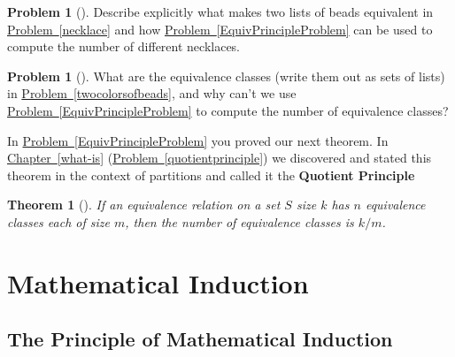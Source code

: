 \documentclass[10pt,]{book}
\newcommand{\terminology}[1]{\textbf{#1}}
\theoremstyle{plain}
\newtheorem{theorem}{Theorem}[section]
\theoremstyle{definition}
\newtheorem{activity}[project]{Problem}
\theoremstyle{definition}
\numberwithin{equation}{chapter}
\begin{document}
\begin{activity}[]\marginsymbol[-1em]{} \label{activity-358}
Describe explicitly what makes two lists of beads equivalent in \hyperref[necklace]{Problem~\ref{necklace}} and how \hyperref[EquivPrincipleProblem]{Problem~\ref{EquivPrincipleProblem}} can be used to compute the number of different necklaces.%
\end{activity}
\begin{activity}[]\marginsymbol[-1em]{} \label{activity-359}
What are the equivalence classes (write them out as sets of lists) in \hyperref[twocolorsofbeads]{Problem~\ref{twocolorsofbeads}}, and why can't we use \hyperref[EquivPrincipleProblem]{Problem~\ref{EquivPrincipleProblem}} to compute the number of equivalence classes?%
\end{activity}
In \hyperref[EquivPrincipleProblem]{Problem~\ref{EquivPrincipleProblem}} you proved our next theorem. In \hyperref[what-is]{Chapter~\ref{what-is}} (\hyperref[quotientprinciple]{Problem~\ref{quotientprinciple}}) we discovered and stated this theorem in the context of partitions and called it the \terminology{Quotient Principle}%
\begin{theorem}[{}]\label{theorem-12}
If an equivalence relation on a set \(S\) size \(k\) has \(n\) equivalence classes each of size \(m\), then the number of equivalence classes is \(k/m\).%
\end{theorem}
\typeout{************************************************}
\typeout{************************************************}
\chapter[{Mathematical Induction}]{Mathematical Induction}\label{Induction}
\typeout{************************************************}
\typeout{************************************************}
\section[{The Principle of Mathematical Induction}]{The Principle of Mathematical Induction}\label{app2-1-induction}
\typeout{************************************************}
\typeout{************************************************}
\end{document}
